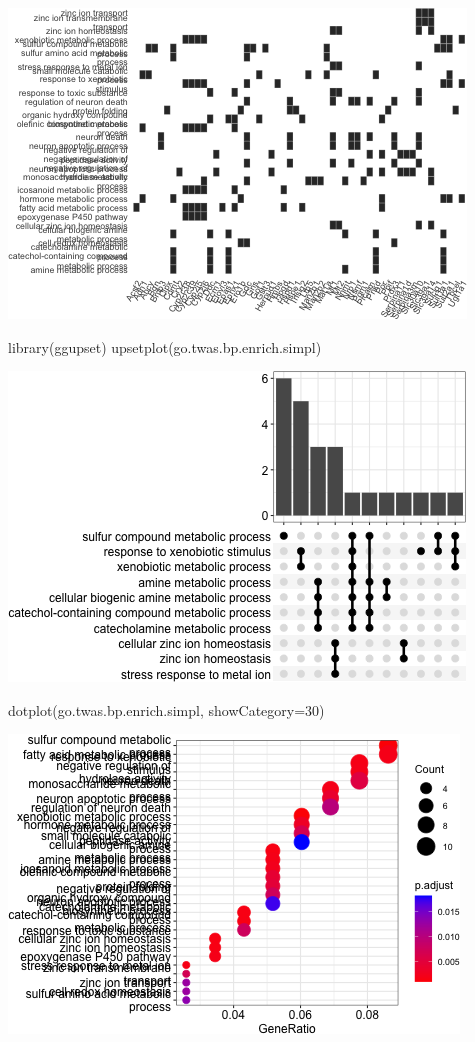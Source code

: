 \documentclass[
]{article}
\newenvironment{Shaded}{\begin{snugshade}}{\end{snugshade}}
\newcommand{\AttributeTok}[1]{\textcolor[rgb]{0.77,0.63,0.00}{#1}}
\newcommand{\DecValTok}[1]{\textcolor[rgb]{0.00,0.00,0.81}{#1}}
\newcommand{\FunctionTok}[1]{\textcolor[rgb]{0.00,0.00,0.00}{#1}}
\newcommand{\NormalTok}[1]{#1}
\begin{document}
\includegraphics{figures/twas-go-hfd-5.png}

\begin{Shaded}
\begin{Highlighting}[]
\FunctionTok{library}\NormalTok{(ggupset)}
\FunctionTok{upsetplot}\NormalTok{(go.twas.bp.enrich.simpl)}
\end{Highlighting}
\end{Shaded}

\includegraphics{figures/twas-go-hfd-6.png}

\begin{Shaded}
\begin{Highlighting}[]
\FunctionTok{dotplot}\NormalTok{(go.twas.bp.enrich.simpl, }\AttributeTok{showCategory=}\DecValTok{30}\NormalTok{)}
\end{Highlighting}
\end{Shaded}

\includegraphics{figures/twas-go-hfd-7.png}
\end{document}
